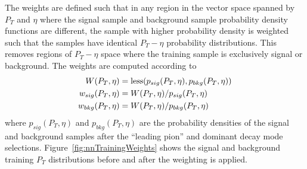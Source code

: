 The weights are defined such that in any region in the vector space spanned by
$P_T$ and $\eta$ where the signal sample and background sample probability
density functions are different, the sample with higher probability density is
weighted such that the samples have identical $P_T-\eta$ probability
distributions.  This removes regions of $P_T-\eta$ space where the training
sample is exclusively signal or background.  The weights are computed according to
\begin{align*}
   W(P_T, \eta) &=  {\rm less}(p_{sig}(P_T, \eta), p_{bkg}(P_T, \eta))\\
   w_{sig}(P_T, \eta) &=  W(P_T, \eta)/p_{sig}(P_T, \eta) \\
   w_{bkg}(P_T, \eta) &=  W(P_T, \eta)/p_{bkg}(P_T, \eta) 
\end{align*}
where $p_{sig}(P_T,\eta)$ and $p_{bkg}(P_T,\eta)$ are the probability densities of
the signal and background samples after the ``leading pion'' and dominant decay mode
selections. Figure~\ref{fig:nnTrainingWeights} shows the signal and background
training $P_T$ distributions before and after the weighting is applied.


